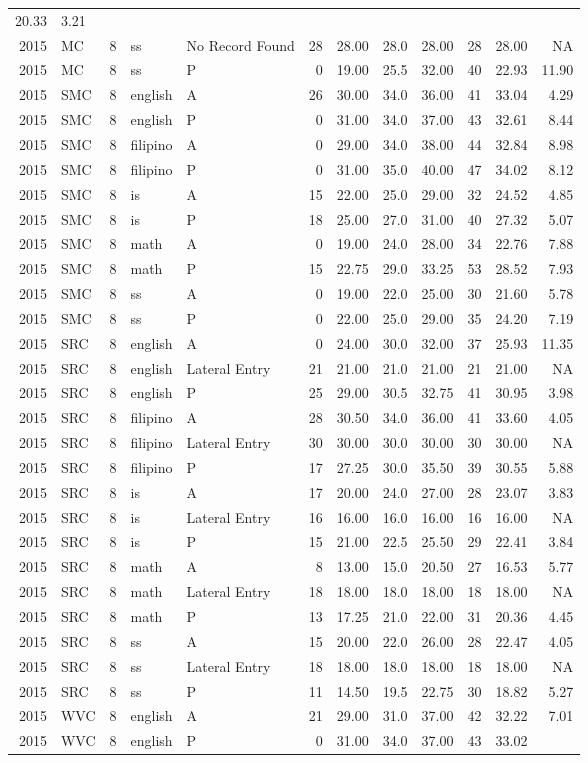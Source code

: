 \documentclass[]{article}
\begin{document}
\begin{longtable}[]{@{}rlrllrrrrrrr@{}}
20.33 & 3.21\tabularnewline
2015 & MC & 8 & ss & No Record Found & 28 & 28.00 & 28.0 & 28.00 & 28 &
28.00 & NA\tabularnewline
2015 & MC & 8 & ss & P & 0 & 19.00 & 25.5 & 32.00 & 40 & 22.93 &
11.90\tabularnewline
2015 & SMC & 8 & english & A & 26 & 30.00 & 34.0 & 36.00 & 41 & 33.04 &
4.29\tabularnewline
2015 & SMC & 8 & english & P & 0 & 31.00 & 34.0 & 37.00 & 43 & 32.61 &
8.44\tabularnewline
2015 & SMC & 8 & filipino & A & 0 & 29.00 & 34.0 & 38.00 & 44 & 32.84 &
8.98\tabularnewline
2015 & SMC & 8 & filipino & P & 0 & 31.00 & 35.0 & 40.00 & 47 & 34.02 &
8.12\tabularnewline
2015 & SMC & 8 & is & A & 15 & 22.00 & 25.0 & 29.00 & 32 & 24.52 &
4.85\tabularnewline
2015 & SMC & 8 & is & P & 18 & 25.00 & 27.0 & 31.00 & 40 & 27.32 &
5.07\tabularnewline
2015 & SMC & 8 & math & A & 0 & 19.00 & 24.0 & 28.00 & 34 & 22.76 &
7.88\tabularnewline
2015 & SMC & 8 & math & P & 15 & 22.75 & 29.0 & 33.25 & 53 & 28.52 &
7.93\tabularnewline
2015 & SMC & 8 & ss & A & 0 & 19.00 & 22.0 & 25.00 & 30 & 21.60 &
5.78\tabularnewline
2015 & SMC & 8 & ss & P & 0 & 22.00 & 25.0 & 29.00 & 35 & 24.20 &
7.19\tabularnewline
2015 & SRC & 8 & english & A & 0 & 24.00 & 30.0 & 32.00 & 37 & 25.93 &
11.35\tabularnewline
2015 & SRC & 8 & english & Lateral Entry & 21 & 21.00 & 21.0 & 21.00 &
21 & 21.00 & NA\tabularnewline
2015 & SRC & 8 & english & P & 25 & 29.00 & 30.5 & 32.75 & 41 & 30.95 &
3.98\tabularnewline
2015 & SRC & 8 & filipino & A & 28 & 30.50 & 34.0 & 36.00 & 41 & 33.60 &
4.05\tabularnewline
2015 & SRC & 8 & filipino & Lateral Entry & 30 & 30.00 & 30.0 & 30.00 &
30 & 30.00 & NA\tabularnewline
2015 & SRC & 8 & filipino & P & 17 & 27.25 & 30.0 & 35.50 & 39 & 30.55 &
5.88\tabularnewline
2015 & SRC & 8 & is & A & 17 & 20.00 & 24.0 & 27.00 & 28 & 23.07 &
3.83\tabularnewline
2015 & SRC & 8 & is & Lateral Entry & 16 & 16.00 & 16.0 & 16.00 & 16 &
16.00 & NA\tabularnewline
2015 & SRC & 8 & is & P & 15 & 21.00 & 22.5 & 25.50 & 29 & 22.41 &
3.84\tabularnewline
2015 & SRC & 8 & math & A & 8 & 13.00 & 15.0 & 20.50 & 27 & 16.53 &
5.77\tabularnewline
2015 & SRC & 8 & math & Lateral Entry & 18 & 18.00 & 18.0 & 18.00 & 18 &
18.00 & NA\tabularnewline
2015 & SRC & 8 & math & P & 13 & 17.25 & 21.0 & 22.00 & 31 & 20.36 &
4.45\tabularnewline
2015 & SRC & 8 & ss & A & 15 & 20.00 & 22.0 & 26.00 & 28 & 22.47 &
4.05\tabularnewline
2015 & SRC & 8 & ss & Lateral Entry & 18 & 18.00 & 18.0 & 18.00 & 18 &
18.00 & NA\tabularnewline
2015 & SRC & 8 & ss & P & 11 & 14.50 & 19.5 & 22.75 & 30 & 18.82 &
5.27\tabularnewline
2015 & WVC & 8 & english & A & 21 & 29.00 & 31.0 & 37.00 & 42 & 32.22 &
7.01\tabularnewline
2015 & WVC & 8 & english & P & 0 & 31.00 & 34.0 & 37.00 & 43 & 33.02 &

\end{longtable}
\end{document}
